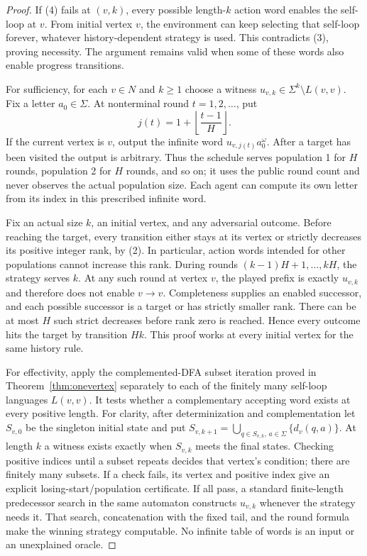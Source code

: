 \documentclass[11pt]{article}
\theoremstyle{definition}
\theoremstyle{remark}
\begin{document}
\begin{proof}
If (4) fails at $(v,k)$, every possible length-$k$ action word enables the
self-loop at $v$. From initial vertex $v$, the environment can keep
selecting that self-loop forever, whatever history-dependent strategy is
used. This contradicts (3), proving necessity. The argument remains valid
when some of these words also enable progress transitions.

For sufficiency, for each $v\in N$ and $k\geq1$ choose a witness
$u_{v,k}\in\Sigma^k\setminus L(v,v)$. Fix a letter $a_0\in\Sigma$.
At nonterminal round $t=1,2,\ldots$, put
\[
 j(t)=1+\left\lfloor\frac{t-1}{H}\right\rfloor.
\]
If the current vertex is $v$, output the infinite word
$u_{v,j(t)}a_0^\omega$. After a target has been visited the output is
arbitrary. Thus the schedule serves population 1 for $H$ rounds, population
2 for $H$ rounds, and so on; it uses the public round count and never
observes the actual population size. Each agent can compute its own letter
from its index in this prescribed infinite word.

Fix an actual size $k$, an initial vertex, and any adversarial outcome.
Before reaching the target, every transition either stays at its vertex
or strictly decreases its positive integer rank, by (2). In particular,
action words intended for other populations cannot increase this rank.
During rounds $(k-1)H+1,\ldots,kH$, the strategy serves $k$. At any such
round at vertex $v$, the played prefix is exactly $u_{v,k}$ and therefore
does not enable $v\to v$. Completeness supplies an enabled successor,
and each possible successor is a target or has strictly smaller rank.
There can be at most $H$ such strict decreases before rank zero is reached.
Hence every outcome hits the target by transition $Hk$.
This proof works at every initial vertex for the same history rule.

For effectivity, apply the complemented-DFA subset iteration proved in
Theorem~\ref{thm:onevertex} separately to each of the finitely many
self-loop languages $L(v,v)$. It tests whether a complementary accepting
word exists at every positive length. For clarity, after determinization
and complementation let $S_{v,0}$ be the singleton initial state and put
$S_{v,k+1}=\bigcup_{q\in S_{v,k},\,a\in\Sigma}\{d_v(q,a)\}$.
At length $k$ a witness exists exactly when $S_{v,k}$ meets the final
states. Checking positive indices until a subset repeats decides that
vertex's condition; there are finitely many subsets. If a check fails,
its vertex and positive index give an explicit losing-start/population
certificate. If all pass, a standard finite-length predecessor search in
the same automaton constructs $u_{v,k}$ whenever the strategy needs it.
That search, concatenation with the fixed tail, and the round formula
make the winning strategy computable. No infinite table of words is an
input or an unexplained oracle.
\end{proof}
\end{document}
